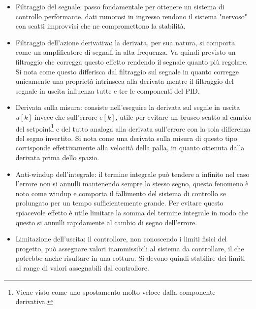 \documentclass[12pt,twoside,openright]{report}
\begin{document}
\begin{itemize}
\item Filtraggio del segnale: passo fondamentale per ottenere un sistema di controllo performante, dati rumorosi in ingresso rendono il sistema "nervoso" con scatti improvvisi che ne compromettono la stabilità.
\item Filtraggio dell'azione derivativa: la derivata, per sua natura, si comporta come un amplificatore di segnali in alta frequenza. Va quindi previsto un filtraggio che corregga questo effetto rendendo il segnale quanto più regolare. Si nota come questo differisca dal filtraggio sul segnale in quanto corregge unicamente una proprietà intrinseca alla derivata mentre il filtraggio del segnale in uscita influenza tutte e tre le componenti del PID. %
\item Derivata sulla misura: consiste nell'eseguire la derivata sul segnle in uscita $u[k]$ invece che sull'errore $e[k]$, utile per evitare un brusco scatto al cambio del setpoint\footnote{Viene visto come uno spostamento molto veloce dalla componente derivativa.} e del tutto analoga alla derivata sull'errore con la sola differenza del segno invertito. Si nota come una derivata sulla misura di questo tipo corrisponde effettivamente alla velocità della palla, in quanto ottenuta dalla derivata prima dello spazio.
\item Anti-windup dell'integrale: il termine integrale può tendere a infinito nel caso l'errore non si annulli mantenendo sempre lo stesso segno, questo fenomeno è noto come windup e comporta il fallimento del sistema di controllo se prolungato per un tempo sufficientemente grande. Per evitare questo spiacevole effetto è utile limitare la somma del termine integrale in modo che questo si annulli rapidamente al cambio di segno dell'errore.
\item Limitazione dell'uscita: il controllore, non conoscendo i limiti fisici del progetto, può assegnare valori inammissibili al sistema da controllare, il che potrebbe anche risultare in una rottura. Si devono quindi stabilire dei limiti al range di valori assegnabili dal controllore.
\end{itemize}
\end{document}
